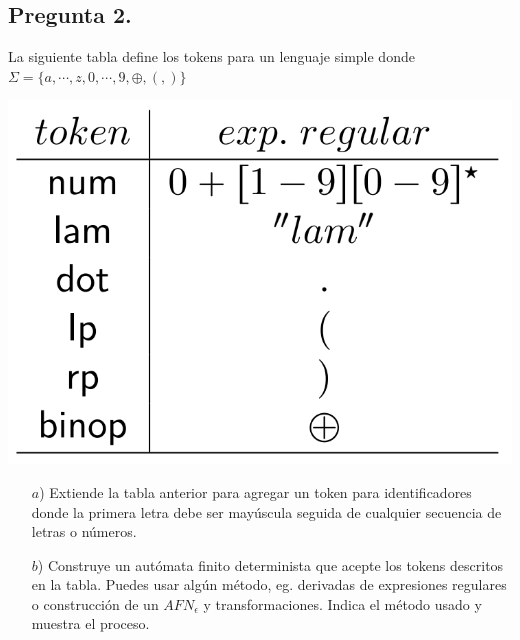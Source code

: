 \subsection*{Pregunta 2.} La siguiente tabla define los tokens para un lenguaje simple donde
$\Sigma = \{a, \dotsm, z, 0, \dotsm, 9, \oplus, (, )\}$
\begin{center}
  \includegraphics[scale=0.20]{./Tabla.png}
\end{center}
\begin{itemize}
\item[$a$)] Extiende la tabla anterior para agregar un token para identificadores donde la
  primera letra debe ser mayúscula seguida de cualquier secuencia de letras o números.
\item[$b$)] Construye un autómata finito determinista que acepte los tokens descritos en la tabla.
  Puedes usar algún método, eg. derivadas de expresiones regulares o construcción de un $AFN_{\epsilon}$ y
  transformaciones. Indica el método usado y muestra el proceso.
\end{itemize}

